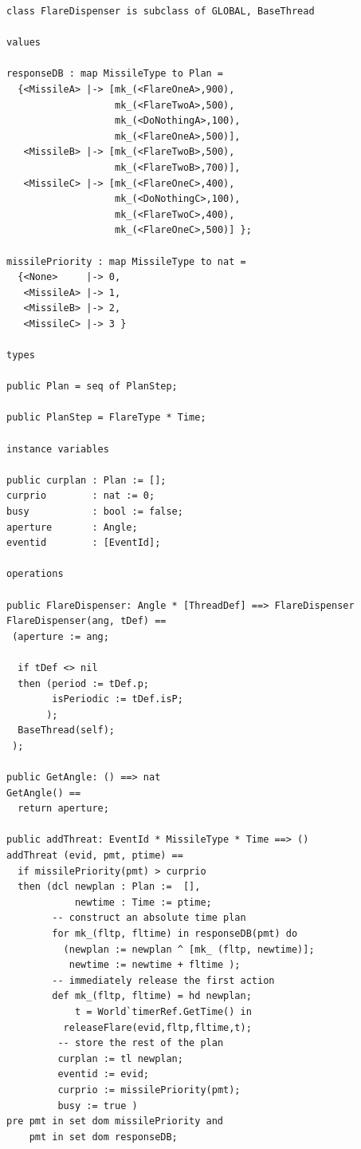 \documentclass{overturerepchap}
\begin{document}
\begin{lstlisting}
class FlareDispenser is subclass of GLOBAL, BaseThread

values

responseDB : map MissileType to Plan =
  {<MissileA> |-> [mk_(<FlareOneA>,900),
                   mk_(<FlareTwoA>,500),
                   mk_(<DoNothingA>,100),
                   mk_(<FlareOneA>,500)],
   <MissileB> |-> [mk_(<FlareTwoB>,500),
                   mk_(<FlareTwoB>,700)],
   <MissileC> |-> [mk_(<FlareOneC>,400),
                   mk_(<DoNothingC>,100),
                   mk_(<FlareTwoC>,400),
                   mk_(<FlareOneC>,500)] };

missilePriority : map MissileType to nat =
  {<None>     |-> 0,
   <MissileA> |-> 1,
   <MissileB> |-> 2,
   <MissileC> |-> 3 }

types

public Plan = seq of PlanStep;

public PlanStep = FlareType * Time;

instance variables

public curplan : Plan := [];
curprio        : nat := 0;
busy           : bool := false;
aperture       : Angle;
eventid        : [EventId];

operations

public FlareDispenser: Angle * [ThreadDef] ==> FlareDispenser
FlareDispenser(ang, tDef) ==
 (aperture := ang;
 
  if tDef <> nil
  then (period := tDef.p;
        isPeriodic := tDef.isP;
       );
  BaseThread(self);
 );

public GetAngle: () ==> nat
GetAngle() ==
  return aperture;

public addThreat: EventId * MissileType * Time ==> ()
addThreat (evid, pmt, ptime) ==
  if missilePriority(pmt) > curprio
  then (dcl newplan : Plan :=  [],
            newtime : Time := ptime;
        -- construct an absolute time plan
        for mk_(fltp, fltime) in responseDB(pmt) do
          (newplan := newplan ^ [mk_ (fltp, newtime)];
           newtime := newtime + fltime );
        -- immediately release the first action
        def mk_(fltp, fltime) = hd newplan;
            t = World`timerRef.GetTime() in
          releaseFlare(evid,fltp,fltime,t);
         -- store the rest of the plan
         curplan := tl newplan;
         eventid := evid;
         curprio := missilePriority(pmt);
         busy := true )
pre pmt in set dom missilePriority and
    pmt in set dom responseDB;


\end{lstlisting}
\end{document}
